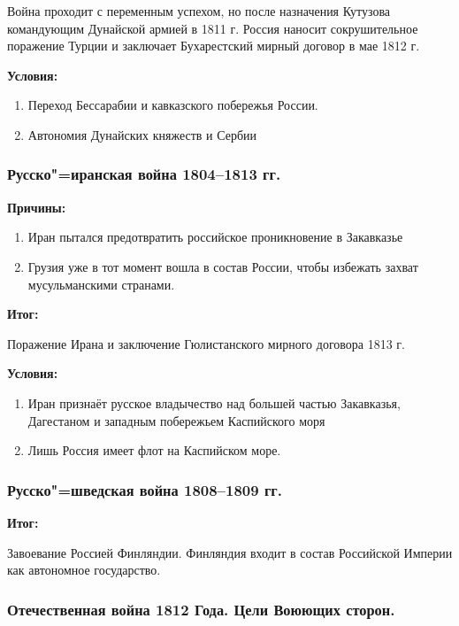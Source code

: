 Война проходит с переменным успехом, но после назначения Кутузова командующим Дунайской армией в 1811 г. Россия наносит сокрушительное поражение Турции и заключает Бухарестский мирный договор в мае 1812 г.

\textbf{Условия:}

\begin{enumerate}
    \item{ Переход Бессарабии и кавказского побережья России. }
    \item{ Автономия Дунайских княжеств и Сербии }
\end{enumerate}

\subsubsection{Русско"=иранская война 1804--1813 гг.}

\textbf{Причины:}

\begin{enumerate}
    \item{ Иран пытался предотвратить российское проникновение в Закавказье }
    \item{ Грузия уже в тот момент вошла в состав России, чтобы избежать захват мусульманскими странами. }
\end{enumerate}

\textbf{Итог:}

Поражение Ирана и заключение Гюлистанского мирного договора 1813 г.

\textbf{Условия:}

\begin{enumerate}
    \item{ Иран признаёт русское владычество над большей частью Закавказья, Дагестаном и западным побережьем Каспийского моря }
    \item{ Лишь Россия имеет флот на Каспийском море. }
\end{enumerate}

\subsubsection{Русско"=шведская война 1808--1809 гг.}

\textbf{Итог:}

Завоевание Россией Финляндии. Финляндия входит в состав Российской Империи как автономное государство.

\subsubsection{Отечественная война 1812 Года. Цели Воюющих сторон.}

